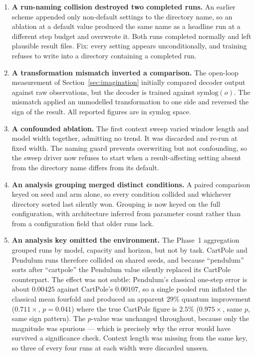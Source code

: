 \documentclass[11pt,onecolumn]{article}
\begin{document}
\begin{enumerate}\itemsep3pt
\item \textbf{A run-naming collision destroyed two completed runs.} An
      earlier scheme appended only non-default settings to the directory
      name, so an ablation at a default value produced the same name as
      a headline run at a different step budget and overwrote it. Both
      runs completed normally and left plausible result files. Fix: every
      setting appears unconditionally, and training refuses to write
      into a directory containing a completed run.
\item \textbf{A transformation mismatch inverted a comparison.} The
      open-loop measurement of Section~\ref{sec:imagination} initially
      compared decoder output against raw observations, but the decoder
      is trained against $\mathrm{symlog}(o)$. The mismatch applied an
      unmodelled transformation to one side and reversed the sign of the
      result. All reported figures are in symlog space.
\item \textbf{A confounded ablation.} The first context sweep varied
      window length and model width together, admitting no trend. It was
      discarded and re-run at fixed width. The naming guard prevents
      overwriting but not confounding, so the sweep driver now refuses
      to start when a result-affecting setting absent from the directory
      name differs from its default.
\item \textbf{An analysis grouping merged distinct conditions.} A paired
      comparison keyed on seed and arm alone, so every condition
      collided and whichever directory sorted last silently won.
      Grouping is now keyed on the full configuration, with architecture
      inferred from parameter count rather than from a configuration
      field that older runs lack.
\item \textbf{An analysis key omitted the environment.} The Phase~1
      aggregation grouped runs by model, capacity and horizon, but not
      by task. CartPole and Pendulum runs therefore collided on shared
      seeds, and because ``pendulum'' sorts after ``cartpole'' the
      Pendulum value silently replaced its CartPole counterpart. The
      effect was not subtle: Pendulum's classical one-step error is
      about $0.00425$ against CartPole's $0.00107$, so a single pooled
      run inflated the classical mean fourfold and produced an apparent
      $29\%$ quantum improvement ($0.711\times$, $p = 0.041$) where the
      true CartPole figure is $2.5\%$ ($0.975\times$, same $p$, same
      sign pattern). The $p$-value was unchanged throughout, because
      only the magnitude was spurious --- which is precisely why the
      error would have survived a significance check. Context length
      was missing from the same key, so three of every four runs at each
      width were discarded unseen.

\end{enumerate}
\end{document}
